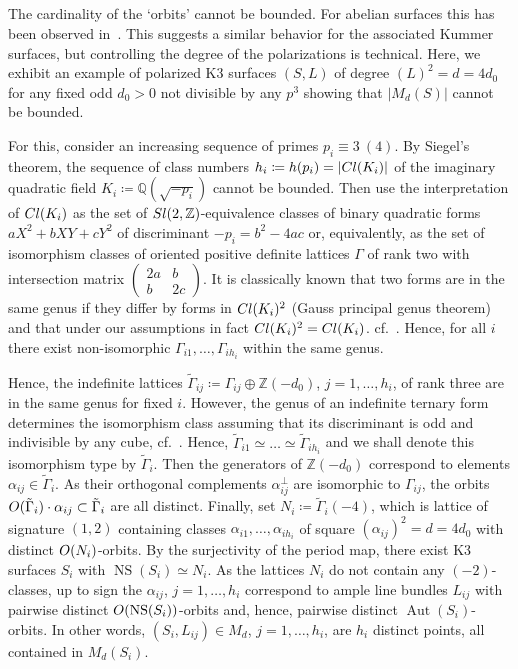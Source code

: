 \documentclass[11pt]{article}
\theoremstyle{definition}
\numberwithin{equation}{section}
\numberwithin{figure}{section}
\numberwithin{table}{section}
\DeclareMathOperator{\Aut}{Aut}
\DeclareMathOperator{\NS}{NS}
\newcommand{\OO}{{\rm O}}
\newcommand{\ZZ}{\mathbb{Z}}
\newcommand{\QQ}{\mathbb{Q}}
\renewcommand{\cong}{\simeq}
\begin{document}
\subsection{}\label{sec:unbound}
The cardinality of the `orbits' cannot be bounded. For abelian surfaces this has been observed in~\cite{Hay,La2}. This suggests a similar behavior for the associated Kummer surfaces, but controlling the degree of the polarizations is technical. Here, we exhibit an example of polarized K3 surfaces $(S,L)$ of degree $(L)^2=d=4d_0$ for any fixed odd $d_0>0$ not divisible by any $p^3$ showing that $|M_{d}(S)|$ cannot be bounded.

For this, consider an increasing sequence of primes $p_i\equiv 3\ (4)$. By Siegel's theorem, the sequence of class numbers $h_i\coloneqq h(p_i)=|{\rm Cl}(K_i)|$ of the imaginary quadratic field $K_i\coloneqq\QQ(\sqrt{-p_i})$ cannot be bounded. Then use the interpretation of ${\rm Cl}(K_i)$ as the set of ${\rm Sl}(2,\ZZ)$-equivalence classes of binary quadratic forms $aX^2+bXY+cY^2$ of discriminant $-p_i=b^2-4ac$ or, equivalently, as the set of isomorphism classes of oriented positive definite lattices $\Gamma$ of rank two with intersection matrix $\left(\begin{smallmatrix}2a&b\\b&2c\end{smallmatrix}\right)$. It is classically known that two forms are in the same genus if they differ by forms in ${\rm Cl}(K_i)^2$ (Gauss principal genus theorem) and that under our assumptions in fact ${\rm Cl}(K_i)^2={\rm Cl}(K_i)$. cf.~\cite[Proposition~3.11]{Cox}. Hence, for all $i$ there exist non-isomorphic $\Gamma_{i1},\dots,\Gamma_{ih_i}$ within the same genus.

Hence, the indefinite lattices $\tilde\Gamma_{ij}\coloneqq\Gamma_{ij}\oplus\ZZ(-d_0)$, $j=1,\dots,h_i$, of rank three are in the same genus for fixed $i$. However, the genus of an indefinite ternary form determines the isomorphism class assuming that its discriminant is odd and indivisible by any cube, cf.~\cite[Chapter~15, Theorem~21]{Conway}. Hence, $\tilde\Gamma_{i1}\cong\dots\cong\tilde\Gamma_{ih_i}$ and we shall denote this isomorphism type by $\tilde\Gamma_i$. Then the generators of $\ZZ(-d_0)$ correspond to elements $\alpha_{ij}\in\tilde\Gamma_i$. As their orthogonal complements $\alpha_{ij}^\perp$ are isomorphic to $\Gamma_{ij}$, the orbits $\OO(\tilde\Gamma_i)\cdot\alpha_{ij}\subset\tilde\Gamma_i$ are all distinct. Finally, set $N_i\coloneqq \tilde\Gamma_i(-4)$, which is lattice of signature $(1,2)$ containing classes $\alpha_{i1},\dots,\alpha_{ih_i}$ of square $(\alpha_{ij})^2=d=4 d_0$ with distinct $\OO(N_i)$-orbits. By the surjectivity of the period map, there exist K3 surfaces $S_i$ with $\NS(S_i)\cong N_i$. As the lattices $N_i$ do not contain any $(-2)$-classes, up to sign the $\alpha_{ij}$, $j=1,\dots,h_i$ correspond to ample line bundles $L_{ij}$ with pairwise distinct $\OO(\NS(S_i))$-orbits and, hence, pairwise distinct $\Aut(S_i)$-orbits. In other words, $(S_i,L_{ij})\in M_{d}$, $j=1,\dots,h_i$, are $h_i$ distinct points, all contained in $M_{d}(S_i)$.
\end{document}
